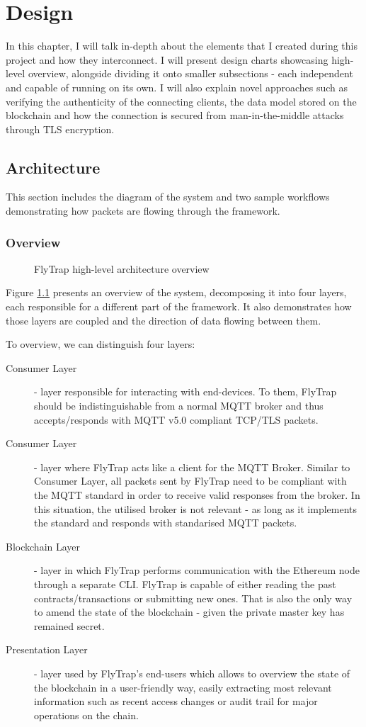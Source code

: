 \chapter{Design\label{chap:design}}
In this chapter, I will talk in-depth about the elements that I created during this project and how they interconnect. I will present design charts showcasing high-level overview, alongside dividing it onto smaller subsections - each independent and capable of running on its own. I will also explain novel approaches such as verifying the authenticity of the connecting clients, the data model stored on the blockchain and how the connection is secured from man-in-the-middle attacks through TLS encryption.

\section{Architecture}
This section includes the diagram of the system and two sample workflows demonstrating how packets are flowing through the framework.
\subsection{Overview}
\begin{figure}[h]
    \centering
    \caption{FlyTrap high-level architecture overview}
    \label{fig:flytrap}
\end{figure}
Figure \ref{fig:flytrap} presents an overview of the system, decomposing it into four layers, each responsible for a different part of the framework. It also demonstrates how those layers are coupled and the direction of data flowing between them.

To overview, we can distinguish four layers:
\begin{description}
    \item[Consumer Layer] - layer responsible for interacting with end-devices. To them, FlyTrap should be indistinguishable from a normal MQTT broker and thus accepts/responds with MQTT v5.0 compliant TCP/TLS packets. 
    \item[Consumer Layer] - layer where FlyTrap acts like a client for the MQTT Broker. Similar to Consumer Layer, all packets sent by FlyTrap need to be compliant with the MQTT standard in order to receive valid responses from the broker. In this situation, the utilised broker is not relevant - as long as it implements the standard and responds with standarised MQTT packets.
    \item[Blockchain Layer] - layer in which FlyTrap performs communication with the Ethereum node through a separate CLI. FlyTrap is capable of either reading the past contracts/transactions or submitting new ones. That is also the only way to amend the state of the blockchain - given the private master key has remained secret.
    \item[Presentation Layer] - layer used by FlyTrap's end-users which allows to overview the state of the blockchain in a user-friendly way, easily extracting most relevant information such as recent access changes or audit trail for major operations on the chain.
\end{description}


